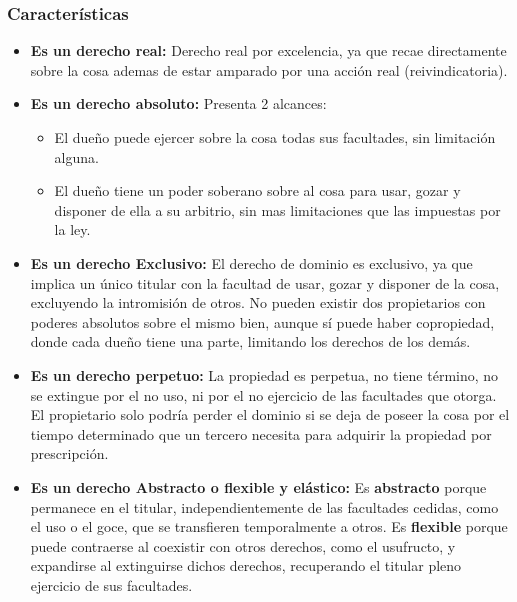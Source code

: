 \documentclass{templateNote}
\begin{document}
\subsubsection{Características}
\begin{itemize}
    \item \textbf{Es un derecho real:} Derecho real por excelencia, ya que recae directamente sobre la cosa ademas de estar amparado por una acción real (reivindicatoria).
    \item \textbf{Es un derecho absoluto:} Presenta 2 alcances:
    \begin{itemize}
        \item El dueño puede ejercer sobre la cosa todas sus facultades, sin limitación alguna.
        \item El dueño tiene un poder soberano sobre al cosa para usar, gozar y disponer de ella a su arbitrio, sin mas limitaciones que las impuestas por la ley.
    \end{itemize}
    \item \textbf{Es un derecho Exclusivo:} El derecho de dominio es exclusivo, ya que implica un único titular con la facultad de usar, gozar y disponer de la cosa, excluyendo la intromisión de otros. No pueden existir dos propietarios con poderes absolutos sobre el mismo bien, aunque sí puede haber copropiedad, donde cada dueño tiene una parte, limitando los derechos de los demás.
    \item \textbf{Es un derecho perpetuo:} La propiedad es perpetua, no tiene término, no se extingue por el no uso, ni por el no ejercicio de las facultades que otorga. El propietario solo podría perder el dominio si se deja de poseer la cosa por el tiempo determinado que un tercero necesita para adquirir la propiedad por prescripción.
    \item \textbf{Es un derecho Abstracto o flexible y elástico:} Es \textbf{abstracto} porque permanece en el titular, independientemente de las facultades cedidas, como el uso o el goce, que se transfieren temporalmente a otros. Es \textbf{flexible} porque puede contraerse al coexistir con otros derechos, como el usufructo, y expandirse al extinguirse dichos derechos, recuperando el titular pleno ejercicio de sus facultades. 
\end{itemize}
\end{document}
